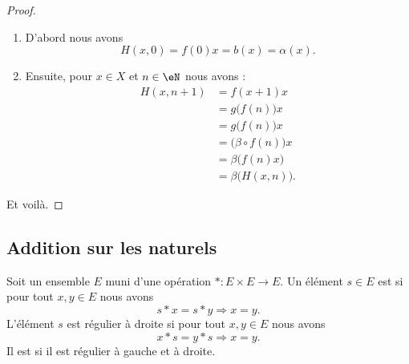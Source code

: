 \begin{proof}
	\begin{enumerate}
		\item
		      D'abord nous avons
		      \begin{equation}
			      H(x,0)=f(0)x=b(x)=\alpha(x).
		      \end{equation}
		\item
		      Ensuite, pour \( x\in X\) et \( n\in \eN\) nous avons :
		      \begin{subequations}
			      \begin{align}
				      H(x,n+1) & =f(x+1)x                      \\
				               & =g\big( f(n) \big)x           \\
				               & =g\big( f(n) \big)x           \\
				               & =\big( \beta\circ f(n) \big)x \\
				               & =\beta\big( f(n)x \big)       \\
				               & =\beta\big( H(x,n) \big).
			      \end{align}
		      \end{subequations}
	\end{enumerate}
	Et voilà.
\end{proof}

\subsection{Addition sur les naturels}

\begin{definition}        \label{DEFooIJIEooZaAdSs}
	Soit un ensemble \( E\) muni d'une opération \( *\colon E\times E\to E\). Un élément \( s\in E\) est  si pour tout \( x,y\in E\) nous avons
	\begin{equation}
		s*x=s*y\Rightarrow x=y.
	\end{equation}
	L'élément \( s\) est régulier à droite si pour tout \( x,y\in E\) nous avons
	\begin{equation}
		x*s=y*s\Rightarrow x=y.
	\end{equation}
	Il est  si il est régulier à gauche et à droite.
\end{definition}


